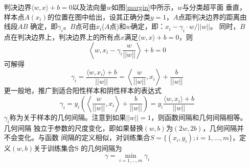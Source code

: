 判决边界$\langle{}w,x\rangle+b=0$以及法向量$w$如图\ref{margin}中所示，$w$与分类超平面
垂直，样本点$A(x_i)$的位置在图中给出，设其正确分类$y=1$，$A$点距判决边界的距离由线段$AB$
确定，即$\gamma_i$。$B$点可由$x_i$($A$点)和$w$确定，即：$x_i-\gamma_i\cdot{}w/||w||$。
同时，$B$点在判决边界上，判决边界上的所有点$x$满足$\langle{}w,x\rangle+b=0$，则
\begin{equation}
    \left\langle{}w,x_i-\gamma_i\frac{w}{||w||}\right\rangle+b=0
\end{equation}
可解得
\begin{equation}
    \gamma_i=\frac{\langle{}w,x_i\rangle+b}{||w||}=\left\langle\frac{w}{||w||},x_i\right\rangle
    +\frac{b}{||w||}
\end{equation}
更一般地，推广到适合阳性样本和阴性样本的表达式
\begin{equation}
    \gamma_i=y_i\left(\left\langle\frac{w}{||w||},x_i\right\rangle
    +\frac{b}{||w||}\right)=y_i\frac{\langle{}w,x_i\rangle+b}{||w||}
\end{equation}
$\gamma_i$称为关于样本的几何间隔。注意到如果$||w||=1$，则函数间隔和几何间隔相等。几何间隔
独立于参数的尺度变化，即如果替换$(w,b)$为$(2w,2b)$，几何间隔并不会变化。与函数
间隔的定义相似，对训练集合$S=\{(x_i,y_i);i=1,...,m\}$，定义$(w,b)$关于训练集合S
的几何间隔为
\begin{equation}
    \gamma=\min_{i=1,...,m}\gamma_i
\end{equation}

